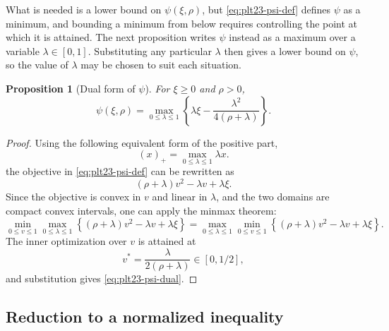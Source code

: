 ﻿\documentclass[11pt]{article}
\newtheorem{proposition}[theorem]{Proposition}
\numberwithin{equation}{section}
\newcommand{\pos}[1]{\left(#1\right)_{+}}
\begin{document}
What is needed is a lower bound on $\psi(\xi,\rho)$, but \eqref{eq:plt23-psi-def} defines $\psi$ as a minimum, and bounding a minimum from below requires controlling the point at which it is attained.
The next proposition writes $\psi$ instead as a maximum over a variable $\lambda\in[0,1]$.
Substituting any particular $\lambda$ then gives a lower bound on $\psi$, so the value of $\lambda$ may be chosen to suit each situation.

\begin{proposition}[Dual form of $\psi$]\label{prop:plt23-huber-dual}
  For $\xi\ge0$ and $\rho>0$,
  \begin{equation}\label{eq:plt23-psi-dual}
    \psi(\xi,\rho)=
    \max_{0\le\lambda\le1}
    \left\{
    \lambda\xi-\frac{\lambda^2}{4(\rho+\lambda)}
    \right\}.
  \end{equation}
\end{proposition}

\begin{proof}
  Using the following equivalent form of the positive part,
  \[
    \pos x=\max_{0\le\lambda\le1}\lambda x.
  \]
  the objective in \eqref{eq:plt23-psi-def} can be rewritten as
  \[
    (\rho+\lambda)v^2-\lambda v+\lambda\xi.
  \]
  Since the objective is convex in $v$ and linear in $\lambda$, and the two domains are compact convex intervals, one can apply the minmax theorem:
  \[
    \min_{0\le v\le1}\max_{0\le\lambda\le1} \left\{ (\rho+\lambda)v^2-\lambda v+\lambda\xi \right\} = \max_{0\le\lambda\le1}\min_{0\le v\le1} \left\{ (\rho+\lambda)v^2-\lambda v+\lambda\xi \right\}.
  \]
  The inner optimization over $v$ is attained at
  \[
    v^*=\frac{\lambda}{2(\rho+\lambda)}\in[0,1/2],
  \]
  and substitution gives \eqref{eq:plt23-psi-dual}.
\end{proof}


\subsection{Reduction to a normalized inequality}\label{subsec:plt23-variables}
\end{document}
